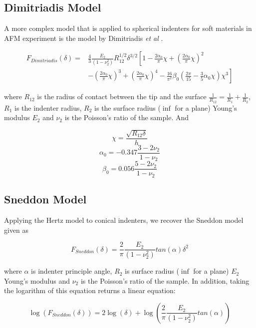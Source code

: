 \subsection{Dimitriadis Model\label{Appendix: Dimitriadis}}
A more complex model that is applied to spherical indenters for soft materials in AFM experiment is the model by Dimitriadis \textit{et al} \cite{DIMITRIADIS20022798}.

\begin{equation} 
\begin{split}
F_{Dimitriadis}(\delta) = & \frac{4}{3}\frac{E_{2}}{(1-\nu_{2}^2)}R_{12}^{1/2}\delta^{3/2} \left[ 1 - \frac{2\alpha_0}{\pi}\chi + \left(\frac{2\alpha_0}{\pi}\chi\right)^2 \right. \\ 
& -\left. \left(\frac{2\alpha_0}{\pi}\chi\right)^3 +  \left(\frac{2\alpha_0}{\pi}\chi\right)^4 -\frac{16}{\pi^2}\beta_0 \left( \frac{2\pi}{15}  - \frac{3}{5}\alpha_0\chi \right)\chi^3 \right]
\end{split} 
\label{eq: Dimitriadis}
\end{equation}

where $R_{12}$ is the radius of contact between the tip and the surface $\frac{1}{R_{12}} = \frac{1}{R_{1}} + \frac{1}{R_{2}} $, $R_1$ is the indenter radius, $R_2$ is the surface radius ($\inf$ for a plane) Young's modulus $E_2$ and $\nu_2$ is the Poisson’s ratio of the sample. And 

$$\chi = \frac{\sqrt{R_{12}\delta}}{h}$$
$$\alpha_0 = -0.347\frac{3-2\nu_{2}}{1-\nu_{2}}$$
$$\beta_0 = 0.056\frac{5-2\nu_{2}}{1-\nu_{2}}$$


\subsection{Sneddon Model\label{Appendix: Sneddon}}

Applying the Hertz model to conical indenters, we recover the Sneddon model\cite{han2021modified} given as

\begin{equation}F_{Sneddon}(\delta) = \frac{2}{\pi}\frac{E_2}{(1-\nu_2^2)}tan(\alpha)\delta^{2}\label{eq: Sneddon}\end{equation}

where $\alpha$ is indenter principle angle, $R_2$ is surface radius ($\inf$ for a plane) $E_2$ Young’s modulus and $\nu_2$ is the Poisson’s ratio of the sample.  In addition, taking the logarithm of this equation returns a linear equation: 

\begin{equation} \log\left(F_{Sneddon}(\delta) \right) = 2\log(\delta) + \log\left(\frac{2}{\pi}\frac{E_2}{(1-\nu_2^2)}tan(\alpha)\right) \label{eq: Sneddon Log} \end{equation}

